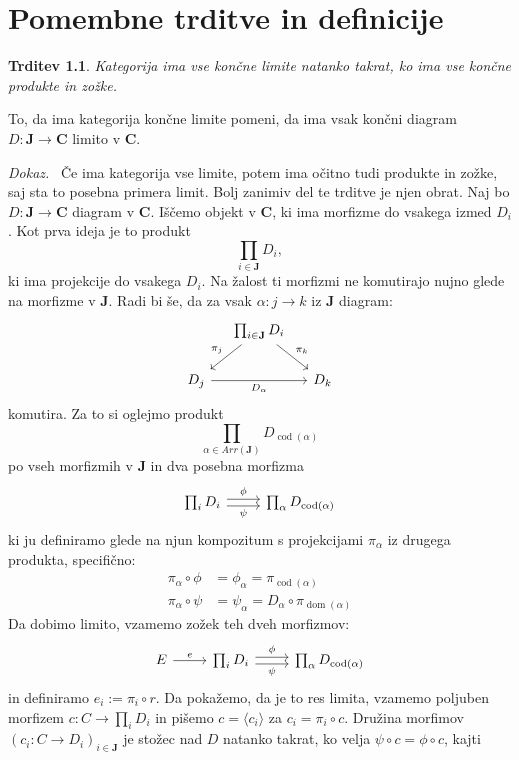 \documentclass[12pt,a4paper]{book}
\theoremstyle{definition}
\theoremstyle{plain}
\newtheorem{trditev}[definicija]{Trditev}
\newenvironment{dokaz}{\emph{Dokaz.}\ }{\hspace{\fill}{$\Box$}}
\theoremstyle{definition}
\theoremstyle{remark}
\newcommand{\cat}[1]{\textbf{#1}}
\DeclareMathOperator{\dom}{dom}
\DeclareMathOperator{\cod}{cod}
\begin{document}
\chapter{Pomembne trditve in definicije}


\begin{trditev} \label{konstrukcija limit}
Kategorija ima vse končne limite natanko takrat, ko ima vse končne produkte in zožke.
\end{trditev}
To, da ima kategorija končne limite pomeni, da ima vsak končni diagram $D : \cat{J} \to \cat{C}$ limito v $\cat{C}$.

\begin{dokaz}
Če ima kategorija vse limite, potem ima očitno tudi produkte in zožke, saj sta to posebna primera limit. Bolj zanimiv del te trditve je njen obrat.
Naj bo $D : \cat{J} \to \cat{C}$ diagram v $\cat{C}$. Iščemo objekt v $\cat{C}$, ki ima morfizme do vsakega izmed $D_i$. Kot prva ideja je to produkt 
$$\prod_{i \in \cat{J}}D_i,$$
ki ima projekcije do vsakega $D_i$. Na žalost ti morfizmi ne komutirajo nujno glede na morfizme v $\cat{J}$. Radi bi še, da za vsak $\alpha : j \to k$ iz  $\cat{J}$ diagram:
%
$$ \begin{tikzcd}[column sep=small]
& \prod_{i \in \cat{J}}D_i \ar[dl, "\pi_j"'] \ar[dr, "\pi_k"] & \\
D_j \ar[rr, "D_\alpha"'] && D_k
\end{tikzcd} $$
komutira. Za to si oglejmo produkt
$$ \prod_{\alpha \in Arr(\cat{J})} D_{\cod(\alpha)} $$
po vseh morfizmih v $\cat{J}$ in dva posebna morfizma
$$ \begin{tikzcd}[sep=normal]
\prod_{i }D_i \ar[r, shift left, "\phi"] \ar[r, shift right, "\psi"'] & \prod_{\alpha } D_{\cod(\alpha)}
\end{tikzcd} $$
ki ju definiramo glede na njun kompozitum s projekcijami $\pi_\alpha$ iz drugega produkta, specifično:
\begin{align*}
\pi_\alpha \circ \phi &= \phi_\alpha = \pi_{\cod(\alpha)} \\
\pi_\alpha \circ \psi &= \psi_\alpha = D_\alpha \circ \pi_{\dom(\alpha)}
\end{align*}
Da dobimo limito, vzamemo zožek teh dveh morfizmov:
$$ \begin{tikzcd}[sep=normal]
E \ar[r, "e"] & \prod_{i }D_i \ar[r, shift left, "\phi"] \ar[r, shift right, "\psi"'] & \prod_{\alpha } D_{\cod(\alpha)}
\end{tikzcd} $$
in definiramo $e_i := \pi_i \circ r$. Da pokažemo, da je to res limita, vzamemo poljuben morfizem $c : C \to \prod_i D_i$ in pišemo $c = \langle c_i \rangle$ za $c_i = \pi_i \circ c$. Družina morfimov $(c_i : C \to D_i)_{i \in \cat{J}}$ je stožec nad $D$ natanko takrat, ko velja $\psi \circ c = \phi \circ c$, kajti

\end{dokaz}
\end{document}
